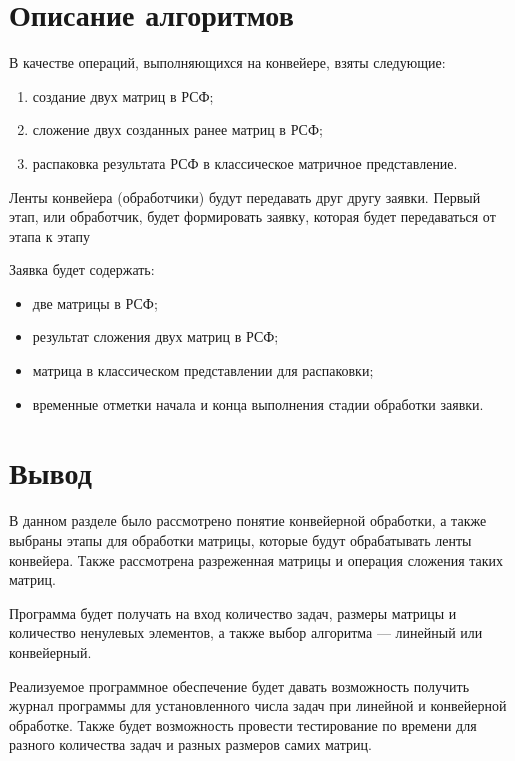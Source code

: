 \section{Описание алгоритмов}

В качестве операций, выполняющихся на конвейере, взяты следующие:
\begin{enumerate}
	\item создание двух матриц в РСФ;
	\item сложение двух созданных ранее матриц в РСФ;
	\item распаковка результата РСФ в классическое матричное представление.
\end{enumerate}

Ленты конвейера (обработчики) будут передавать друг другу заявки. Первый этап, или обработчик, будет формировать заявку, которая будет передаваться от этапа к этапу

Заявка будет содержать:
\begin{itemize}
	\item две матрицы в РСФ;
	\item результат сложения двух матриц в РСФ;
	\item матрица в классическом представлении для распаковки;
	\item временные отметки начала и конца выполнения стадии обработки заявки.
\end{itemize}

\section*{Вывод}
В данном разделе было рассмотрено понятие конвейерной обработки, а также выбраны этапы для обработки матрицы, которые будут обрабатывать ленты конвейера. Также рассмотрена разреженная матрицы и операция сложения таких матриц.

Программа будет получать на вход количество задач, размеры матрицы и количество ненулевых элементов, а также выбор алгоритма --- линейный или конвейерный.

Реализуемое программное обеспечение будет давать возможность получить журнал программы для установленного числа задач при линейной и конвейерной обработке. 
Также будет возможность провести тестирование по времени для разного количества задач и разных размеров самих матриц.